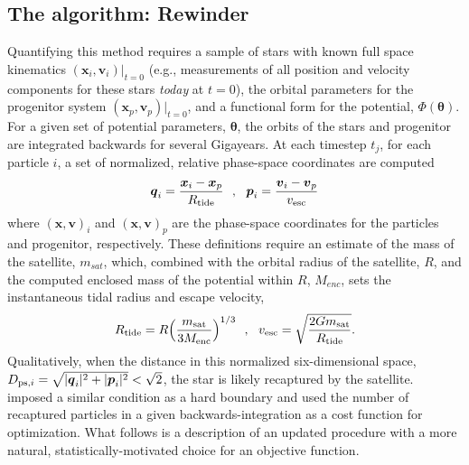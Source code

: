 \documentclass{emulateapj}
\newcommand{\bs}{\boldsymbol}
\begin{document}
\subsection{The algorithm: Rewinder}
Quantifying this method requires a sample of stars with known full
space kinematics $(\bs{x}_{i}, \bs{v}_{i})|_{t=0}$ (e.g., measurements
of all position and velocity components for these stars \emph{today}
at $t=0$), the orbital parameters for the progenitor system
$(\bs{x}_p, \bs{v}_p)|_{t=0}$, and a functional form for the
potential, $\Phi({\boldsymbol\theta})$. For a given set of potential
parameters, $\boldsymbol\theta$, the orbits of the stars and
progenitor are integrated backwards for several Gigayears. At
each timestep $t_j$, for each particle $i$, a set of normalized,
relative phase-space coordinates are computed
\begin{equation}
  \bs{q}_{i} = \frac{\bs{x}_{i} -
    \bs{x}_{p}}{R_{\rm tide}}\,\,\,\,,\,\,\,\,\bs{p}_{i} = \frac{\bs{v}_{i} -
    \bs{v}_{p}}{v_{\rm esc}}
\end{equation}
where $(\bs{x},\bs{v})_{i}$ and $(\bs{x},\bs{v})_{p}$ are the
phase-space coordinates for the particles and progenitor,
respectively. These definitions require an estimate of the mass of the
satellite, $m_{sat}$, which, combined with the orbital radius of the
satellite, $R$, and the computed enclosed mass of the potential within
$R$, $M_{enc}$, sets the instantaneous tidal radius and escape
velocity,
\begin{equation}
  R_{\rm tide}=R\Big(\frac{m_{\rm sat}}{3M_{\rm enc}}\Big)^{1/3}\,\,\,\,,\,\,\,\,
  v_{\rm esc}=\sqrt{\frac{2Gm_{\rm sat}}{R_{\rm tide}}}.
\end{equation}
Qualitatively, when the distance in this normalized six-dimensional
space, $D_{{\rm ps},i}=\sqrt{|\bs{q}_{i}|^2+|\bs{p}_{i}|^2} <
\sqrt{2}$, the star is likely recaptured by the
satellite. \citet{johnston99a} imposed a similar
condition as a hard boundary and used the number of recaptured
particles in a given backwards-integration as a cost function for
optimization. What follows is a description of an updated procedure
with a more natural, statistically-motivated choice for an objective
function.
\end{document}

